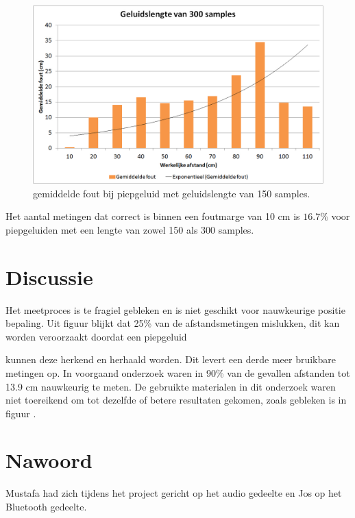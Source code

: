 \documentclass[12pt]{article}
\begin{document}
\begin{figure}[h!]
\centering
\includegraphics[scale=0.4]{300-samples}
\caption{gemiddelde fout bij piepgeluid met geluidslengte van 150 samples.}
\end{figure}

Het aantal metingen dat correct is binnen een foutmarge van 10 cm is $16.7 \%$ voor piepgeluiden met een lengte van zowel 150 als 300 samples. 

\section{Discussie}
\label{sec:discussie}

Het meetproces is te fragiel gebleken en is niet geschikt voor nauwkeurige positie bepaling. Uit figuur blijkt dat 25\% van de afstandsmetingen mislukken, dit kan worden veroorzaakt doordat een piepgeluid 

kunnen deze herkend en herhaald worden. Dit levert een derde meer bruikbare metingen op. In voorgaand onderzoek waren in 90\% van de gevallen afstanden tot 13.9 cm nauwkeurig te meten. De gebruikte materialen in dit onderzoek waren niet toereikend om tot dezelfde of betere resultaten gekomen, zoals gebleken is in figuur .

\section{Nawoord}
\label{sec:nawoord}
Mustafa had zich tijdens het project gericht op het audio gedeelte en Jos op het Bluetooth gedeelte.




\end{document}
